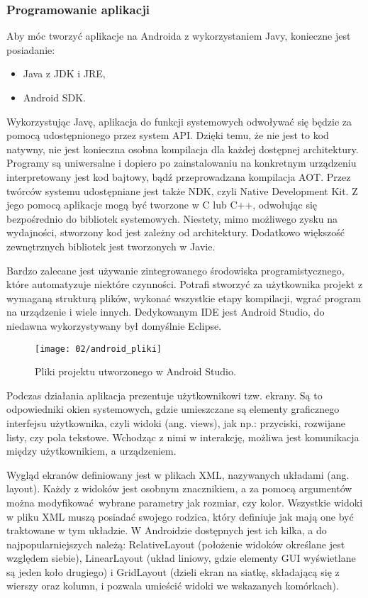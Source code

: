 \subsubsection*{Programowanie aplikacji}
Aby móc tworzyć aplikacje na Androida z wykorzystaniem Javy, konieczne jest posiadanie:

\begin{itemize}
	\item Java z JDK i JRE,
	\item Android SDK.
\end{itemize}

Wykorzystując Javę, aplikacja do funkcji systemowych odwoływać się będzie za pomocą udostępnionego przez system API. Dzięki temu, że nie jest to kod natywny, nie jest konieczna osobna kompilacja dla każdej dostępnej architektury. Programy są uniwersalne i dopiero po zainstalowaniu na konkretnym urządzeniu interpretowany jest kod bajtowy, bądź przeprowadzana kompilacja AOT. Przez twórców systemu udostępniane jest także NDK, czyli Native Development Kit. Z jego pomocą aplikacje mogą być tworzone w C lub C++, odwołując się bezpośrednio do bibliotek systemowych. Niestety, mimo możliwego zysku na wydajności, stworzony kod jest zależny od architektury. Dodatkowo większość zewnętrznych bibliotek jest tworzonych w Javie. 

Bardzo zalecane jest używanie zintegrowanego środowiska programistycznego, które automatyzuje niektóre czynności. Potrafi stworzyć za użytkownika projekt z wymaganą strukturą plików, wykonać wszystkie etapy kompilacji, wgrać program na urządzenie i wiele innych. Dedykowanym IDE jest Android Studio, do niedawna wykorzystywany był domyślnie Eclipse.

\begin{figure}[h]
	\begin{center}
		\texttt{[image: 02/android\_pliki]}
	\end{center}
	\caption{Pliki projektu utworzonego w Android Studio.}
	\vspace{-0.3cm}
\end{figure}

Podczas działania aplikacja prezentuje użytkownikowi tzw. ekrany. Są to odpowiedniki okien systemowych, gdzie umieszczane są elementy graficznego interfejsu użytkownika, czyli widoki (ang. views), jak np.: przyciski, rozwijane listy, czy pola tekstowe. Wchodząc z nimi w interakcję, możliwa jest komunikacja między użytkownikiem, a urządzeniem. 

Wygląd ekranów definiowany jest w plikach XML, nazywanych układami (ang. layout). Każdy z widoków jest osobnym znacznikiem, a za pomocą argumentów można modyfikować wybrane parametry jak rozmiar, czy kolor. Wszystkie widoki w pliku XML muszą posiadać swojego rodzica, który definiuje jak mają one być traktowane w tym układzie. W Androidzie dostępnych jest ich kilka, a do najpopularniejszych należą: RelativeLayout (położenie widoków określane jest względem siebie), LinearLayout (układ liniowy, gdzie elementy GUI wyświetlane są jeden koło drugiego) i GridLayout (dzieli ekran na siatkę, składającą się z wierszy oraz kolumn, i pozwala umieścić widoki we wskazanych komórkach).

